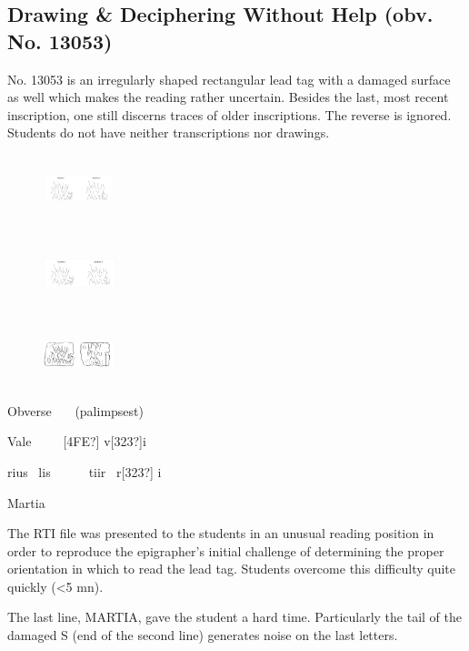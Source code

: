 \documentclass[amsthm,ebook]{saparticle}
\begin{document}
\subsection{Drawing \& Deciphering Without Help (obv. No. 13053)}


No. 13053 is an irregularly shaped rectangular lead tag with a damaged surface as well which makes the reading rather
uncertain. Besides the last, most recent inscription, one still discerns traces of older inscriptions. The reverse is
ignored. Students do not have neither transcriptions nor drawings.



\begin{figure}
\centering
\includegraphics[width=2.009cm,height=1.96cm]{EAGLE16lameetalteaching-img010.png}
\end{figure}
\begin{figure}
\centering
\includegraphics[width=2.103cm,height=1.961cm]{EAGLE16lameetalteaching-img010.png}
\end{figure}
\begin{figure}
\centering
\includegraphics[width=2.044cm,height=1.794cm]{EAGLE16lameetalteaching-img011.png}
\end{figure}
Obverse \ \ \ (palimpsest)

Vale\ \  \ \ \ [4FE?] v[323?]i\ \ 

rius \ lis\ \  \ \ \ \ tiir \ r[323?] i

Martia\ \  \ \ \ \ 

The RTI file was presented to the students in an unusual reading position in order to reproduce the epigrapher’s initial
challenge of determining the proper orientation in which to read the lead tag. Students overcome this difficulty quite
quickly ({\textless}5 mn).

The last line, MARTIA, gave the student a hard time. Particularly the tail of the damaged S (end of the second line)
generates noise on the last letters.
\end{document}
